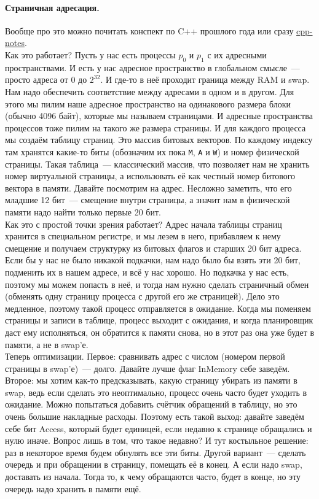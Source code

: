 \documentclass{article}
\begin{document}
    \paragraph{Страничная адресация.}
    Вообще про это можно почитать конспект по C++ прошлого года или сразу \href{https://github.com/CPP-KT/cpp-notes}{cpp-notes}.\\
    Как это работает? Пусть у нас есть процессы $p_0$ и $p_1$ с их адресными пространствами. И есть у нас адресное пространство в глобальном смысле~--- просто адреса от 0 до $2^{32}$. И где-то в неё проходит граница между RAM и swap. Нам надо обеспечить соответствие между адресами в одном и в другом. Для этого мы пилим наше адресное пространство на одинакового размера блоки (обычно 4096 байт), которые мы называем страницами. И адресные пространства процессов тоже пилим на такого же размера страницы. И для каждого процесса мы создаём таблицу страниц. Это массив битовых векторов. По каждому индексу там хранятся какие-то биты (обозначим их пока \Verb|M|, \Verb|A| и \Verb|W|) и номер физической страницы. Такая таблица~--- классический массив, что позволяет нам не хранить номер виртуальной страницы, а использовать её как честный номер битового вектора в памяти. Давайте посмотрим на адрес. Несложно заметить, что его младшие 12 бит~--- смещение внутри страницы, а значит нам в физической памяти надо найти только первые 20 бит.\\
    Как это с простой точки зрения работает? Адрес начала таблицы страниц хранится в специальном регистре, и мы лезем в него, прибавляем к нему смещение и получаем структурку из битовых флагов и старших 20 бит адреса. Если бы у нас не было никакой подкачки, нам надо было бы взять эти 20 бит, подменить их в нашем адресе, и всё у нас хорошо. Но подкачка у нас есть, поэтому мы можем попасть в неё, и тогда нам нужно сделать страничный обмен (обменять одну страницу процесса с другой его же страницей). Дело это медленное, поэтому такой процесс отправляется в ожидание. Когда мы поменяем страницы и записи в таблице, процесс выходит с ожидания, и когда планировщик даст ему исполняться, он обратится к памяти снова, но в этот раз она уже будет в памяти, а не в swap'е.\\
    Теперь оптимизации. Первое: сравнивать адрес с числом (номером первой страницы в swap'е)~--- долго. Давайте лучше флаг InMemory себе заведём.\\
    Второе: мы хотим как-то предсказывать, какую страницу убирать из памяти в swap, ведь если сделать это неоптимально, процесс очень часто будет уходить в ожидание. Можно попытаться добавить счётчик обращений в таблицу, но это очень большие накладные расходы. Поэтому есть такой выход: давайте заведём себе бит Access, который будет единицей, если недавно к странице обращались и нулю иначе. Вопрос лишь в том, что такое недавно? И тут костыльное решение: раз в некоторое время будем обнулять все эти биты. Другой вариант~--- сделать очередь и при обращении в страницу, помещать её в конец. А если надо swap, доставать из начала. Тогда то, к чему обращаются часто, будет в конце, но эту очередь надо хранить в памяти ещё.\\
\end{document}
